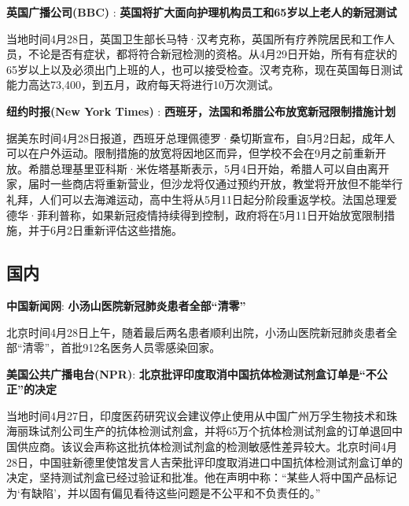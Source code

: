 \documentclass[]{article}
\begin{document}
\textbf{\textcolor{glaucous}{英国广播公司(BBC)}} :
\textbf{英国将扩大面向护理机构员工和65岁以上老人的新冠测试}

当地时间4月28日，英国卫生部长马特·汉考克称，英国所有疗养院居民和工作人员，不论是否有症状，都将符合新冠检测的资格。从4月29日开始，所有有症状的65岁以上以及必须出门上班的人，也可以接受检查。汉考克称，现在英国每日测试能力高达73,400，到五月，政府每天将进行10万次测试。

\textbf{\textcolor{glaucous}{纽约时报(New York Times)}} :
\textbf{西班牙，法国和希腊公布放宽新冠限制措施计划 }

据美东时间4月28日报道，西班牙总理佩德罗·桑切斯宣布，自5月2日起，成年人可以在户外运动。限制措施的放宽将因地区而异，但学校不会在9月之前重新开放。希腊总理基里亚科斯·米佐塔基斯表示，5月4日开始，希腊人可以自由离开家，届时一些商店将重新营业，但沙龙将仅通过预约开放，教堂将开放但不能举行礼拜，人们可以去海滩运动，高中生将从5月11日起分阶段重返学校。法国总理爱德华·菲利普称，如果新冠疫情持续得到控制，政府将在5月11日开始放宽限制措施，并于6月2日重新评估这些措施。

\vspace{-5mm}

\hypertarget{section-1}{%
\subsection{\texorpdfstring{\textcolor{glaucous}{\Huge 国内}}{}}\label{section-1}}

\vspace{-3mm}

\textbf{\textcolor{glaucous}{中国新闻网}}:
\textbf{小汤山医院新冠肺炎患者全部``清零'' }

北京时间4月28日上午，随着最后两名患者顺利出院，小汤山医院新冠肺炎患者全部``清零''，首批912名医务人员零感染回家。

\textbf{\textcolor{glaucous}{美国公共广播电台(NPR)}}:
\textbf{北京批评印度取消中国抗体检测试剂盒订单是``不公正''的决定}

当地时间4月27日，印度医药研究议会建议停止使用从中国广州万孚生物技术和珠海丽珠试剂公司生产的抗体检测试剂盒，并将65万个抗体检测试剂盒的订单退回中国供应商。该议会声称这批抗体检测试剂盒的检测敏感性差异较大。北京时间4月28日，中国驻新德里使馆发言人吉荣批评印度取消进口中国抗体检测试剂盒订单的决定，坚持测试剂盒已经过验证和批准。他在声明中称：``某些人将中国产品标记为`有缺陷'，并以固有偏见看待这些问题是不公平和不负责任的。''

\vspace{5mm}
\end{document}
